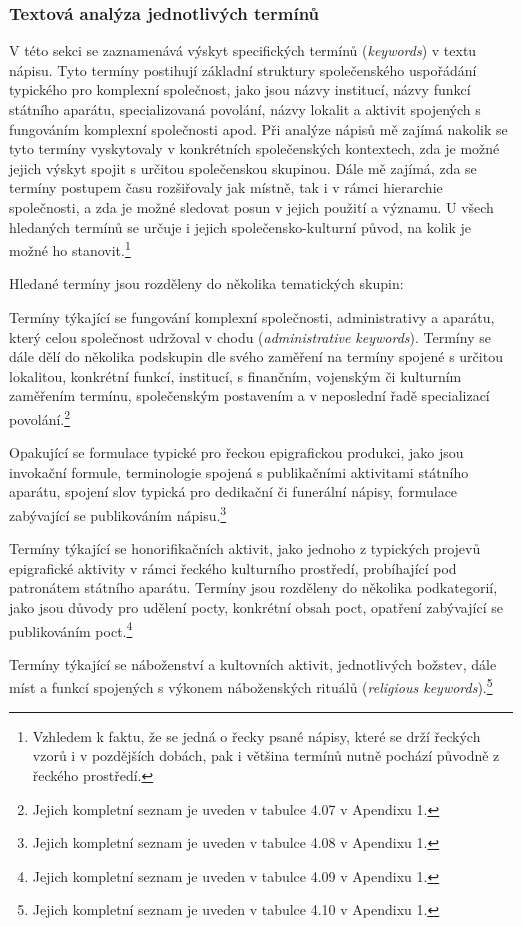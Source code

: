 \subsubsection[textová-analýza-jednotlivých-termínů]{Textová analýza jednotlivých termínů}

V této sekci se zaznamenává výskyt specifických termínů ({\em keywords}) v textu nápisu. Tyto termíny postihují základní struktury společenského uspořádání typického pro komplexní společnost, jako jsou názvy institucí, názvy funkcí státního aparátu, specializovaná povolání, názvy lokalit a aktivit spojených s fungováním komplexní společnosti apod. Při analýze nápisů mě zajímá nakolik se tyto termíny vyskytovaly v konkrétních společenských kontextech, zda je možné jejich výskyt spojit s určitou společenskou skupinou. Dále mě zajímá, zda se termíny postupem času rozšiřovaly jak místně, tak i v rámci hierarchie společnosti, a zda je možné sledovat posun v jejich použití a významu. U všech hledaných termínů se určuje i jejich společensko-kulturní původ, na kolik je možné ho stanovit.\footnote{Vzhledem k faktu, že se jedná o řecky psané nápisy, které se drží řeckých vzorů i v pozdějších dobách, pak i většina termínů nutně pochází původně z řeckého prostředí.}

Hledané termíny jsou rozděleny do několika tematických skupin:

\startitemize[n][stopper=.]
\item
  \startblockquote
  Termíny týkající se fungování komplexní společnosti, administrativy a aparátu, který celou společnost udržoval v chodu ({\em administrative keywords}). Termíny se dále dělí do několika podskupin dle svého zaměření na termíny spojené s určitou lokalitou, konkrétní funkcí, institucí, s finančním, vojenským či kulturním zaměřením termínu, společenským postavením a v neposlední řadě specializací povolání.\footnote{Jejich kompletní seznam je uveden v tabulce 4.07 v Apendixu 1.}
  \stopblockquote
\item
  \startblockquote
  Opakující se formulace typické pro řeckou epigrafickou produkci, jako jsou invokační formule, terminologie spojená s publikačními aktivitami státního aparátu, spojení slov typická pro dedikační či funerální nápisy, formulace zabývající se publikováním nápisu.\footnote{Jejich kompletní seznam je uveden v tabulce 4.08 v Apendixu 1.}
  \stopblockquote
\item
  \startblockquote
  Termíny týkající se honorifikačních aktivit, jako jednoho z typických projevů epigrafické aktivity v rámci řeckého kulturního prostředí, probíhající pod patronátem státního aparátu. Termíny jsou rozděleny do několika podkategorií, jako jsou důvody pro udělení pocty, konkrétní obsah poct, opatření zabývající se publikováním poct.\footnote{Jejich kompletní seznam je uveden v tabulce 4.09 v Apendixu 1.}
  \stopblockquote
\item
  \startblockquote
  Termíny týkající se náboženství a kultovních aktivit, jednotlivých božstev, dále míst a funkcí spojených s výkonem náboženských rituálů ({\em religious keywords}).\footnote{Jejich kompletní seznam je uveden v tabulce 4.10 v Apendixu 1.}
  \stopblockquote

